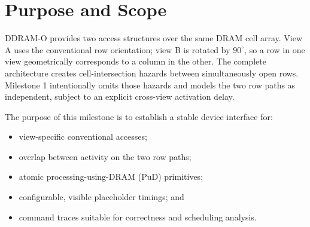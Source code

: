 \documentclass[9pt,twocolumn]{extarticle}
\newcommand{\viewA}{\textsf{A}}
\newcommand{\viewB}{\textsf{B}}
\begin{document}

\tableofcontents

\section{Purpose and Scope}

DDRAM-O provides two access structures over the same DRAM cell array. View
\viewA{} uses the conventional row orientation; view \viewB{} is rotated by
$90^\circ$, so a row in one view geometrically corresponds to a column in the
other. The complete architecture creates cell-intersection hazards between
simultaneously open rows. Milestone 1 intentionally omits those hazards and
models the two row paths as independent, subject to an explicit cross-view
activation delay.

The purpose of this milestone is to establish a stable device interface for:

\begin{itemize}
  \item view-specific conventional accesses;
  \item overlap between activity on the two row paths;
  \item atomic processing-using-DRAM (PuD) primitives;
  \item configurable, visible placeholder timings; and
  \item command traces suitable for correctness and scheduling analysis.
\end{itemize}
\end{document}

